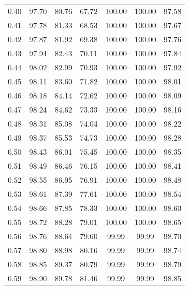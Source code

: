 \begin{tabular}{|c|c|c|c|c|c|c|}
      0.40 &     97.70 &     80.76 &      67.72 &  100.00 &     100.00 &         97.58 \\
      0.41 &     97.78 &     81.33 &      68.53 &  100.00 &     100.00 &         97.67 \\
      0.42 &     97.87 &     81.92 &      69.38 &  100.00 &     100.00 &         97.76 \\
      0.43 &     97.94 &     82.43 &      70.11 &  100.00 &     100.00 &         97.84 \\
      0.44 &     98.02 &     82.99 &      70.93 &  100.00 &     100.00 &         97.92 \\
      0.45 &     98.11 &     83.60 &      71.82 &  100.00 &     100.00 &         98.01 \\
      0.46 &     98.18 &     84.14 &      72.62 &  100.00 &     100.00 &         98.09 \\
      0.47 &     98.24 &     84.62 &      73.33 &  100.00 &     100.00 &         98.16 \\
      0.48 &     98.31 &     85.08 &      74.04 &  100.00 &     100.00 &         98.22 \\
      0.49 &     98.37 &     85.53 &      74.73 &  100.00 &     100.00 &         98.28 \\
      0.50 &     98.43 &     86.01 &      75.45 &  100.00 &     100.00 &         98.35 \\
      0.51 &     98.49 &     86.46 &      76.15 &  100.00 &     100.00 &         98.41 \\
      0.52 &     98.55 &     86.95 &      76.91 &  100.00 &     100.00 &         98.48 \\
      0.53 &     98.61 &     87.39 &      77.61 &  100.00 &     100.00 &         98.54 \\
      0.54 &     98.66 &     87.85 &      78.33 &  100.00 &     100.00 &         98.60 \\
      0.55 &     98.72 &     88.28 &      79.01 &  100.00 &     100.00 &         98.65 \\
      0.56 &     98.76 &     88.64 &      79.60 &   99.99 &      99.99 &         98.70 \\
      0.57 &     98.80 &     88.98 &      80.16 &   99.99 &      99.99 &         98.74 \\
      0.58 &     98.85 &     89.37 &      80.79 &   99.99 &      99.99 &         98.79 \\
      0.59 &     98.90 &     89.78 &      81.46 &   99.99 &      99.99 &         98.85 \\

\end{tabular}
